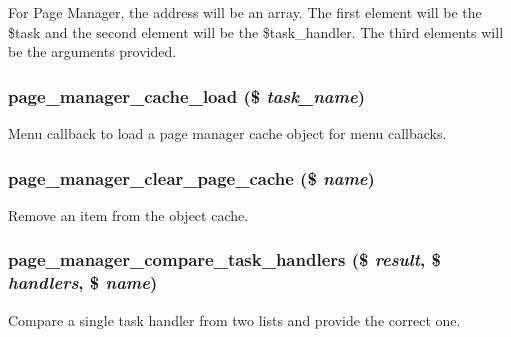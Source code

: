 For Page Manager, the address will be an array. The first element will be the \$task and the second element will be the \$task\_\-handler. The third elements will be the arguments provided. \hypertarget{page__manager_8module_a39f5ee30c6173dd1332d1b60cbdb33fd}{
\subsubsection[{page\_\-manager\_\-cache\_\-load}]{\setlength{\rightskip}{0pt plus 5cm}page\_\-manager\_\-cache\_\-load (\$ {\em task\_\-name})}}
\label{page__manager_8module_a39f5ee30c6173dd1332d1b60cbdb33fd}
Menu callback to load a page manager cache object for menu callbacks. \hypertarget{page__manager_8module_ae48efa1de270237e9dcb4d117cb063a9}{
\subsubsection[{page\_\-manager\_\-clear\_\-page\_\-cache}]{\setlength{\rightskip}{0pt plus 5cm}page\_\-manager\_\-clear\_\-page\_\-cache (\$ {\em name})}}
\label{page__manager_8module_ae48efa1de270237e9dcb4d117cb063a9}
Remove an item from the object cache. \hypertarget{page__manager_8module_aa02498e4dadcc2146ba01fbc0a2e6492}{
\subsubsection[{page\_\-manager\_\-compare\_\-task\_\-handlers}]{\setlength{\rightskip}{0pt plus 5cm}page\_\-manager\_\-compare\_\-task\_\-handlers (\$ {\em result}, \/  \$ {\em handlers}, \/  \$ {\em name})}}
\label{page__manager_8module_aa02498e4dadcc2146ba01fbc0a2e6492}
Compare a single task handler from two lists and provide the correct one.

